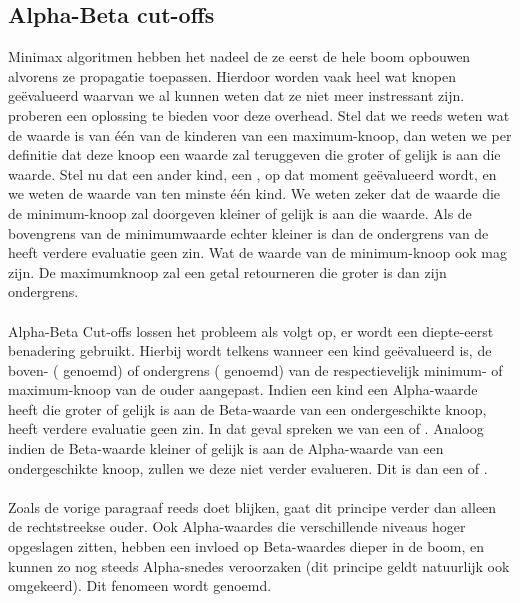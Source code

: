 \subsection{Alpha-Beta cut-offs}
Minimax algoritmen hebben het nadeel de ze eerst de hele boom opbouwen alvorens ze propagatie toepassen. Hierdoor worden vaak heel wat knopen ge\"evalueerd waarvan we al kunnen weten dat ze niet meer instressant zijn.  proberen een oplossing te bieden voor deze overhead. Stel dat we reeds weten wat de waarde is van \'e\'en van de kinderen van een maximum-knoop, dan weten we per definitie dat deze knoop een waarde zal teruggeven die groter of gelijk is aan die waarde. Stel nu dat een ander kind, een , op dat moment ge\"evalueerd wordt, en we weten de waarde van ten minste \'e\'en kind. We weten zeker dat de waarde die de minimum-knoop zal doorgeven kleiner of gelijk is aan die waarde. Als de bovengrens van de minimumwaarde echter kleiner is dan de ondergrens van de  heeft verdere evaluatie geen zin. Wat de waarde van de minimum-knoop ook mag zijn. De maximumknoop zal een getal retourneren die groter is dan zijn ondergrens.
\paragraph{}
Alpha-Beta Cut-offs lossen het probleem als volgt op, er wordt een diepte-eerst benadering gebruikt. Hierbij wordt telkens wanneer een kind ge\"evalueerd is, de boven- ( genoemd) of ondergrens ( genoemd) van de respectievelijk minimum- of maximum-knoop van de ouder aangepast. Indien een kind een Alpha-waarde heeft die groter of gelijk is aan de Beta-waarde van een ondergeschikte knoop, heeft verdere evaluatie geen zin. In dat geval spreken we van een  of . Analoog indien de Beta-waarde kleiner of gelijk is aan de Alpha-waarde van een ondergeschikte knoop, zullen we deze niet verder evalueren. Dit is dan een  of .
\paragraph{}
Zoals de vorige paragraaf reeds doet blijken, gaat dit principe verder dan alleen de rechtstreekse ouder. Ook Alpha-waardes die verschillende niveaus hoger opgeslagen zitten, hebben een invloed op Beta-waardes dieper in de boom, en kunnen zo nog steeds Alpha-snedes veroorzaken (dit principe geldt natuurlijk ook omgekeerd). Dit fenomeen wordt  genoemd.
